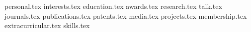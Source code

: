 \documentclass[margin,line]{res}
\newcommand*{\sectiondir}{sections/}
\begin{document}

\begin{resume}

{personal.tex}
{interests.tex}
{education.tex}
{awards.tex}
{research.tex}
{talk.tex}
{journals.tex}
{publications.tex}
{patents.tex}
{media.tex}
{projects.tex}
{membership.tex}
{extracurricular.tex}
{skills.tex}

\end{resume}
\end{document}
